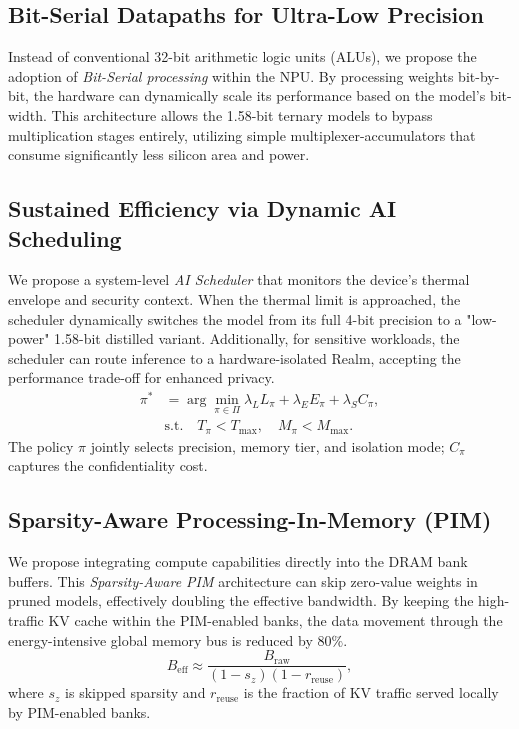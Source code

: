 \documentclass[twocolumn,10pt]{article}
\begin{document}
\subsection{Bit-Serial Datapaths for Ultra-Low Precision}
Instead of conventional 32-bit arithmetic logic units (ALUs), we propose the adoption of \textit{Bit-Serial processing} within the NPU. By processing weights bit-by-bit, the hardware can dynamically scale its performance based on the model's bit-width. This architecture allows the 1.58-bit ternary models to bypass multiplication stages entirely, utilizing simple multiplexer-accumulators that consume significantly less silicon area and power.

\subsection{Sustained Efficiency via Dynamic AI Scheduling}
We propose a system-level \textit{AI Scheduler} that monitors the device's thermal envelope and security context. When the thermal limit is approached, the scheduler dynamically switches the model from its full 4-bit precision to a "low-power" 1.58-bit distilled variant. Additionally, for sensitive workloads, the scheduler can route inference to a hardware-isolated Realm, accepting the performance trade-off for enhanced privacy.
\begin{equation}
\begin{aligned}
\pi^* &= \arg\min_{\pi\in\Pi}
\lambda_L L_\pi + \lambda_E E_\pi + \lambda_S C_\pi,\\
&\text{s.t.}\quad T_\pi<T_{\max},\quad M_\pi<M_{\max}.
\end{aligned}
\label{eq:scheduler}
\end{equation}
The policy $\pi$ jointly selects precision, memory tier, and isolation mode; $C_\pi$ captures the confidentiality cost.

\subsection{Sparsity-Aware Processing-In-Memory (PIM)}
We propose integrating compute capabilities directly into the DRAM bank buffers. This \textit{Sparsity-Aware PIM} architecture can skip zero-value weights in pruned models, effectively doubling the effective bandwidth. By keeping the high-traffic KV cache within the PIM-enabled banks, the data movement through the energy-intensive global memory bus is reduced by $80\%$.
\begin{equation}
B_{\mathrm{eff}}\approx
\frac{B_{\mathrm{raw}}}{(1-s_z)(1-r_{\mathrm{reuse}})},
\label{eq:pim_bandwidth}
\end{equation}
where $s_z$ is skipped sparsity and $r_{\mathrm{reuse}}$ is the fraction of KV traffic served locally by PIM-enabled banks.
\end{document}
